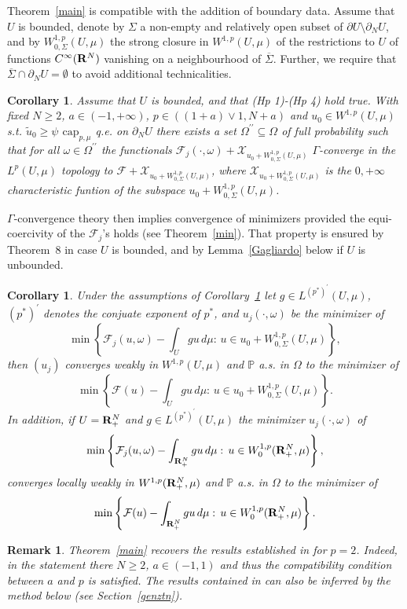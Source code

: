 \documentclass[10pt,reqno]{amsart}
\numberwithin{equation}{section}
\def\L{{\mathcal L}}
\def\R{{\bf R}}
\def\FFepsi{{\mathcal F}_{j}}
\def\Wsp{W^{1,p}}
\def\Wspo{W_0^{1,p}}
\def\WspoG{W_{0,\Sigma}^{1,p}}
\def\capmu{\mathrm{cap}_{p,\mu}}
\def\Om{\Omega}
\def\om{\omega}
\def\FFpsi{{\mathcal F}}
\def\mmu{\mathbb{P}}
\def\UU{\partial_NU}
\newtheorem{corollary}[theorem]{Corollary}
\newtheorem{remark}[theorem]{Remark}
\begin{document}
Theorem~\ref{main} is compatible with the addition of boundary data.
Assume that $U$ is bounded, denote by $\Sigma$ a non-empty and 
relatively open subset of $\partial U\setminus\UU$, and by 
$\WspoG(U,\mu)$ the strong closure in $\Wsp(U,\mu)$ of the restrictions 
to $U$ of functions $C^\infty(\R^N)$ vanishing on a neighbourhood of 
$\overline{\Sigma}$. Further, we require that 
$\overline{\Sigma}\cap\UU=\emptyset$ to avoid additional technicalities.
\begin{corollary}\label{bdryvalue}
Assume that $U$ is bounded, and that (Hp 1)-(Hp 4) hold true. 
With fixed $N\geq 2$, $a\in(-1,+\infty)$, $p\in((1+a)\vee 1,N+a)$ and 
$u_0\in\Wsp(U,\mu)$ s.t. $\tilde{u}_0\geq\psi$ $\capmu$ q.e.
on $\UU$ there exists a set $\Om^{\prime\prime}\subseteq\Om$ 
of full probability such that for all $\om\in\Om^{\prime\prime}$
the functionals $\FFepsi(\cdot,\om)+\mathscr{X}_{u_0+\WspoG(U,\mu)}$
$\Gamma$-converge in the $L^p(U,\mu)$ topology
to $\FFpsi+\mathscr{X}_{u_0+\WspoG(U,\mu)}$,
where $\mathscr{X}_{u_0+\WspoG(U,\mu)}$ is the $0,+\infty$
characteristic funtion of the subspace $u_0+\WspoG(U,\mu)$.
\end{corollary}
$\Gamma$-convergence theory then implies convergence of minimizers
provided the equi-coercivity of the $\FFepsi$'s holds 
(see Theorem~\ref{min}).
That property is ensured by Theorem~8 \cite{K2} in case $U$ is 
bounded, and by Lemma~\ref{Gagliardo} %
below if $U$ is unbounded.

\begin{corollary}
Under the assumptions of Corollary~\ref{bdryvalue}
let $g\in L^{(p^\ast)^\prime}(U,\mu)$,  %
$(p^\ast)^\prime$ denotes the conjuate exponent of $p^\ast$,
and $u_j(\cdot,\om)$ be the minimizer of
$$
\min\left\{\FFepsi(u,\om)-\int_Ugu\,d\mu:\,u\in u_0+\WspoG(U,\mu)\right\},
$$
then $(u_j)$ converges weakly in $\Wsp(U,\mu)$ and $\mmu$ a.s. in $\Om$
to the minimizer of
$$
\min\left\{\FFpsi(u)-\int_Ugu\,d\mu:\,u\in u_0+\WspoG(U,\mu)\right\}.
$$
In addition, if $U=\R^N_+$ and  $g\in L^{(p^\ast)^\prime}(U,\mu)$
the minimizer $u_j(\cdot,\om)$ of
$$
\min\left\{\FFepsi(u,\om)-\int_{\R^N_+}gu\,d\mu:\,u\in\Wspo(\R^N_+,\mu)\right\},
$$
converges locally weakly in $\Wsp(\R^N_+,\mu)$ and $\mmu$ a.s. in $\Om$
to the minimizer of
$$
\min\left\{\FFpsi(u)-\int_{\R^N_+}gu\,d\mu:\,u\in\Wspo(\R^N_+,\mu)\right\}.
$$
\end{corollary}
\begin{remark}
Theorem~\ref{main} recovers the results established in \cite{Caf-Mel2}
for $p=2$. Indeed, in the statement there $N\geq 2$, $a\in(-1,1)$
and thus the compatibility condition between $a$ and $p$ is satisfied.
The results contained in \cite{Caf-Mel1} can also be inferred by the
method below (see Section~\ref{genztn}).
\end{remark}
\end{document}
